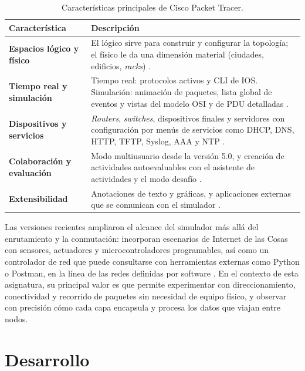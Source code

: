 \begin{table}[H]
    \centering
    \renewcommand{\arraystretch}{1.3}
    \begin{tabular}{|p{3.6cm}|p{11.2cm}|}
        \hline
        \textbf{Característica} & \textbf{Descripción} \\ \hline
        \textbf{Espacios lógico y físico} & El lógico sirve para construir y configurar la topología; el físico le da una dimensión material (ciudades, edificios, \emph{racks}) \cite{ciscopt:ayuda-introduccion}. \\ \hline
        \textbf{Tiempo real y simulación} & Tiempo real: protocolos activos y CLI de IOS. Simulación: animación de paquetes, lista global de eventos y vistas del modelo OSI y de PDU detalladas \cite{ciscopt:ayuda-introduccion}. \\ \hline
        \textbf{Dispositivos y servicios} & \emph{Routers}, \emph{switches}, dispositivos finales y servidores con configuración por menús de servicios como DHCP, DNS, HTTP, TFTP, Syslog, AAA y NTP \cite{ciscopt:ayuda-introduccion}. \\ \hline
        \textbf{Colaboración y evaluación} & Modo multiusuario desde la versión 5.0, y creación de actividades autoevaluables con el asistente de actividades y el modo desafío \cite{ciscopt:ayuda-introduccion, wikipedia:packet-tracer}. \\ \hline
        \textbf{Extensibilidad} & Anotaciones de texto y gráficas, y aplicaciones externas que se comunican con el simulador \cite{ciscopt:ayuda-introduccion}. \\ \hline
    \end{tabular}
    \caption{Características principales de Cisco Packet Tracer.}
    \label{tab:prac04:caracteristicas-pt}
\end{table}

Las versiones recientes ampliaron el alcance del simulador más allá del enrutamiento y la conmutación: incorporan escenarios de Internet de las Cosas con sensores, actuadores y microcontroladores programables, así como un controlador de red que puede consultarse con herramientas externas como Python o Postman, en la línea de las redes definidas por software \cite{wikipedia:packet-tracer}. En el contexto de esta asignatura, su principal valor es que permite experimentar con direccionamiento, conectividad y recorrido de paquetes sin necesidad de equipo físico, y observar con precisión cómo cada capa encapsula y procesa los datos que viajan entre nodos.

\section{Desarrollo}
\label{sec:prac04:desarrollo}

